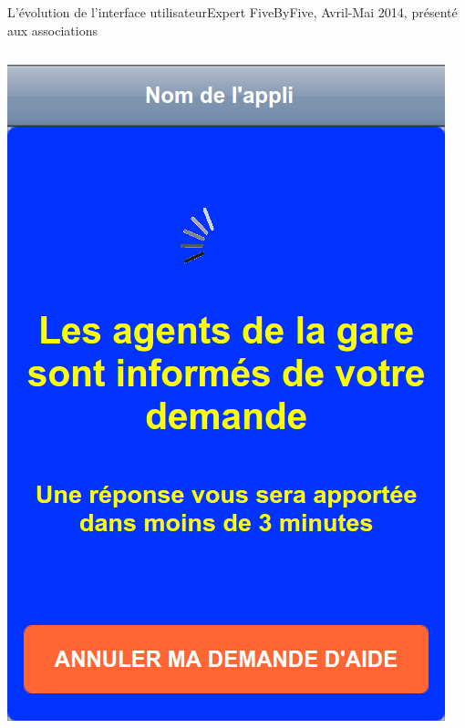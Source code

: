 \documentclass{beamer}
\begin{document}
\begin{frame}{L'évolution de l'interface utilisateur}{Expert FiveByFive, Avril-Mai 2014, présenté aux associations}
\begin{columns}
\begin{column}{0.45\textwidth}
            \includegraphics[width=\textwidth]{judith-03/02-encours.png}
        \end{column}
    \end{columns}
\end{frame}
\end{document}
